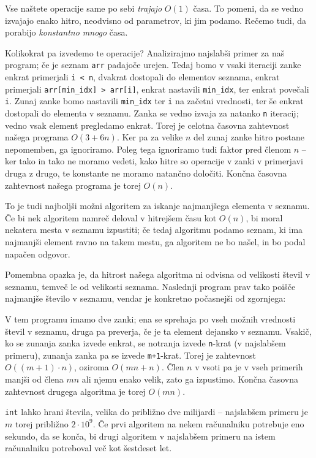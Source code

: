 Vse naštete operacije same po sebi \emph{trajajo} \(O(1)\) časa. To pomeni, da
se vedno izvajajo enako hitro, neodvisno od parametrov, ki jim podamo. Rečemo
tudi, da porabijo \emph{konstantno mnogo} časa.

Kolikokrat pa izvedemo te operacije? Analizirajmo najslabši primer za naš
program; če je seznam \verb+arr+ padajoče urejen. Tedaj bomo v vsaki iteraciji
zanke enkrat primerjali \verb+i < n+, dvakrat dostopali do elementov seznama,
enkrat primerjali \verb+arr[min_idx] > arr[i]+, enkrat nastavili \verb+min_idx+,
ter enkrat povečali \verb+i+. Zunaj zanke bomo nastavili \verb+min_idx+ ter
\verb+i+ na začetni vrednosti, ter še enkrat dostopali do elementa v seznamu.
Zanka se vedno izvaja za natanko \verb+n+ iteracij; vedno vsak element pregledamo
enkrat. Torej je celotna časovna zahtevnost našega programa \(O(3 + 6n)\).
Ker pa za velike \(n\) del zunaj zanke hitro postane nepomemben, ga ignoriramo.
Poleg tega ignoriramo tudi faktor pred členom \(n\) -- ker tako in tako ne moramo
vedeti, kako hitre so operacije v zanki v primerjavi druga z drugo, te konstante
ne moramo natančno določiti. Končna časovna zahtevnost našega programa je torej
\(O(n)\).

To je tudi najboljši možni algoritem za iskanje najmanjšega elementa v seznamu.
Če bi nek algoritem namreč deloval v hitrejšem času kot \(O(n)\), bi moral
nekatera mesta v seznamu izpustiti; če tedaj algoritmu podamo seznam, ki ima
najmanjši element ravno na takem mestu, ga algoritem ne bo našel, in bo podal
napačen odgovor.

Pomembna opazka je, da hitrost našega algoritma ni odvisna od velikosti števil
v seznamu, temveč le od velikosti seznama. Naslednji program prav tako poišče
najmanjše število v seznamu, vendar je konkretno počasnejši od zgornjega:


V tem programu imamo dve zanki; ena se sprehaja po vseh možnih vrednosti števil
v seznamu, druga pa preverja, če je ta element dejansko v seznamu. Vsakič, ko se
zunanja zanka izvede enkrat, se notranja izvede \verb+n+-krat (v najslabšem
primeru), zunanja zanka pa se izvede \verb|m+1|-krat. Torej je zahtevnost
\(O((m+1) \cdot n)\), oziroma \(O(mn + n)\). Člen \(n\) v vsoti pa je v vseh
primerih manjši od člena \(mn\) ali njemu enako velik, zato ga izpustimo.
Končna časovna zahtevnost drugega algoritma je torej \(O(mn)\).

\verb+int+ lahko hrani števila, velika do približno dve milijardi -- najslabšem
primeru je \(m\) torej približno \(2 \cdot 10^9\). Če prvi algoritem na nekem
računalniku potrebuje eno sekundo, da se konča, bi drugi algoritem v najslabšem
primeru na istem računalniku potreboval več kot šestdeset let.

